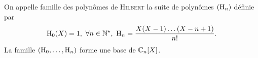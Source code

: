\begin{tcolorbox}
    On appelle famille des polynômes de \textsc{Hilbert} la suite de polynômes $(\mathrm{H}_n)$ définie par
    $$\mathrm{H}_0(X) = 1,\ \forall n \in \mathbb{N}^\star,\ \mathrm{H}_n = \frac{X(X-1)\dots(X-n+1)}{n!}.$$
    La famille $(\mathrm{H}_0, \dots, \mathrm{H}_n)$ forme une base de $\mathbb{C}_n[X]$.
\end{tcolorbox}